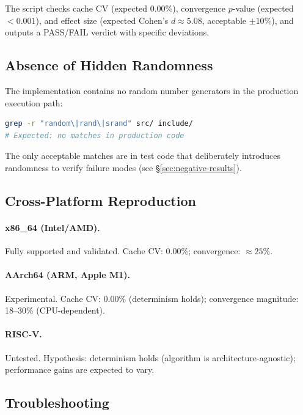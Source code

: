 The script checks cache CV (expected 0.00\%), convergence $p$-value
(expected $< 0.001$), and effect size (expected Cohen's $d \approx 5.08$,
acceptable $\pm 10\%$), and outputs a PASS/FAIL verdict with specific
deviations.

\subsection{Absence of Hidden Randomness}

The implementation contains no random number generators in the production
execution path:

\begin{lstlisting}[language=bash]
grep -r "random\|rand\|srand" src/ include/
# Expected: no matches in production code
\end{lstlisting}

The only acceptable matches are in test code that deliberately introduces
randomness to verify failure modes (see \S\ref{sec:negative-results}).

\subsection{Cross-Platform Reproduction}

\paragraph{x86\_64 (Intel/AMD).} Fully supported and validated. Cache CV:
0.00\%; convergence: $\approx 25\%$.

\paragraph{AArch64 (ARM, Apple M1).} Experimental. Cache CV: 0.00\%
(determinism holds); convergence magnitude: 18--30\% (CPU-dependent).

\paragraph{RISC-V.} Untested. Hypothesis: determinism holds (algorithm is
architecture-agnostic); performance gains are expected to vary.

\subsection{Troubleshooting}

